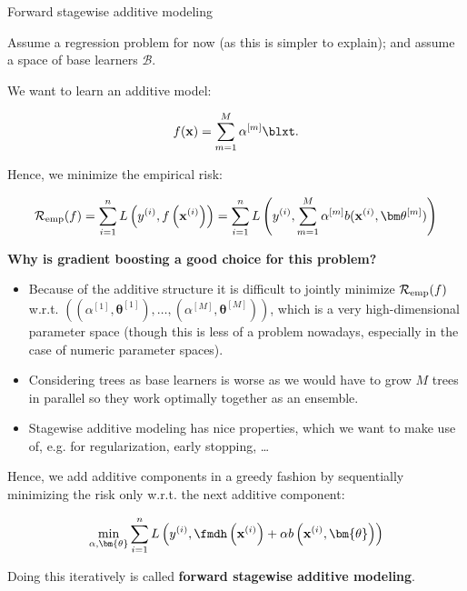 \documentclass[11pt,compress,t,notes=noshow, xcolor=table]{beamer}
\begin{document}
\begin{vbframe}{Forward stagewise additive modeling}

Assume a regression problem for now (as this is simpler to explain);
and assume a space of base learners $\mathcal{B}$.

\lz



We want to learn an additive model:

$$
\fx = \sum_{m=1}^M \alpha^{[m]} \blxt.
$$

Hence, we minimize the empirical risk:

$$
\riskef = \sum_{i=1}^n L\left(\yi,\fxi \right) =
\sum_{i=1}^n L\left(\yi, \sum_{m=1}^M \alpha^{[m]} b(\xi, \thetav^{[m]}) %
\right)
$$







\framebreak
\textbf{Why is gradient boosting a good choice for this problem?}
\begin{itemize}
\item Because of the additive structure it is difficult to jointly minimize $\mathcal{R}_{\text{emp}}(f)$ w.r.t. $\left(\left(\alpha^{[1]}, \bm{\theta}^{[1]}\right), \ldots, \left(\alpha^{[M]}, \bm{\theta}^{[M]}\right)\right)$, which is a very high-dimensional parameter space (though this is less of a problem nowadays, especially in the
case of numeric parameter spaces).
\item Considering trees as base learners is worse as we would have to grow $M$ trees in parallel so they
  work optimally together as an ensemble.
\item Stagewise additive modeling has nice properties, which we want to make use of, e.g. for regularization, early stopping, \dots
\end{itemize}

\framebreak

Hence, we add additive components in a greedy fashion by sequentially minimizing the risk only w.r.t. the next additive component:

$$ \min \limits_{\alpha, \bm{\theta}} \sum_{i=1}^n L\left(\yi, \fmdh\left(\xi\right) + \alpha b\left(\xi, \bm{\theta}\right)\right) $$

\lz

Doing this iteratively is called \textbf{forward stagewise additive modeling}.



\end{vbframe}
\end{document}
